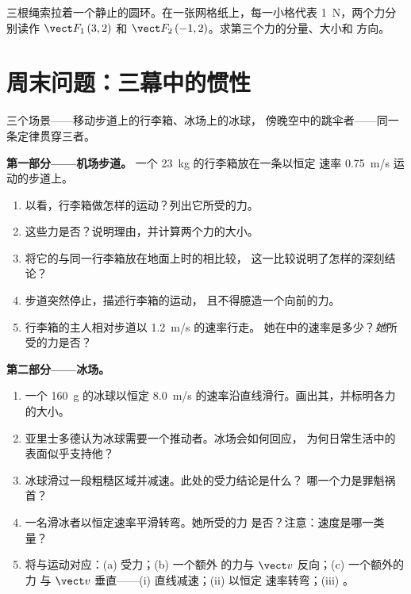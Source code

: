 \begin{exercise}[$\star\star\star$]\label{exo:g10:inertia:15}
三根绳索拉着一个静止的圆环。在一张网格纸上，每一小格代表
\qty{1}{N}，两个力分别读作 $\vect F_1\,(3, 2)$ 和
$\vect F_2\,(-1, 2)$。求第三个力的分量、大小和
方向。
\end{exercise}

\section{周末问题：三幕中的惯性}

\begin{problem}
\label{pb:g10:inertia:1}
三个场景——移动步道上的行李箱、冰场上的冰球，
傍晚空中的跳伞者——同一条定律贯穿三者。

\medskip
\noindent\textbf{第一部分——机场步道。}
一个 \qty{23}{kg} 的行李箱放在一条以恒定
速率 \qty{0.75}{m/s} 运动的步道上。
\begin{enumerate}
  \item 以看，行李箱做怎样的运动？列出它所受的力。
  \item 这些力是否？说明理由，并计算两个力的大小。
  \item 将它的与同一行李箱放在地面上时的相比较，
        这一比较说明了怎样的深刻结论？
  \item 步道突然停止，描述行李箱的运动，
        且不得臆造一个向前的力。
  \item 行李箱的主人相对步道以 \qty{1.2}{m/s} 的速率行走。
        她在中的速率是多少？\emph{她}所受的力是否？
\end{enumerate}

\medskip
\noindent\textbf{第二部分——冰场。}
\begin{enumerate}[resume]
  \item 一个 \qty{160}{g} 的冰球以恒定
        \qty{8.0}{m/s} 的速率沿直线滑行。画出其，并标明各力的大小。
  \item 亚里士多德认为冰球需要一个推动者。冰场会如何回应，
        为何日常生活中的表面似乎支持他？
  \item 冰球滑过一段粗糙区域并减速。此处的受力结论是什么？
        哪一个力是罪魁祸首？
  \item 一名滑冰者以恒定速率平滑转弯。她所受的力
        是否？注意：速度是哪一类量？
  \item 将与运动对应：(a) 受力；(b) 一个额外
        的力与 $\vect v$ 反向；(c) 一个额外的力
        与 $\vect v$ 垂直——(i) 直线减速；(ii) 以恒定
        速率转弯；(iii) 。
\end{enumerate}


\end{problem}
